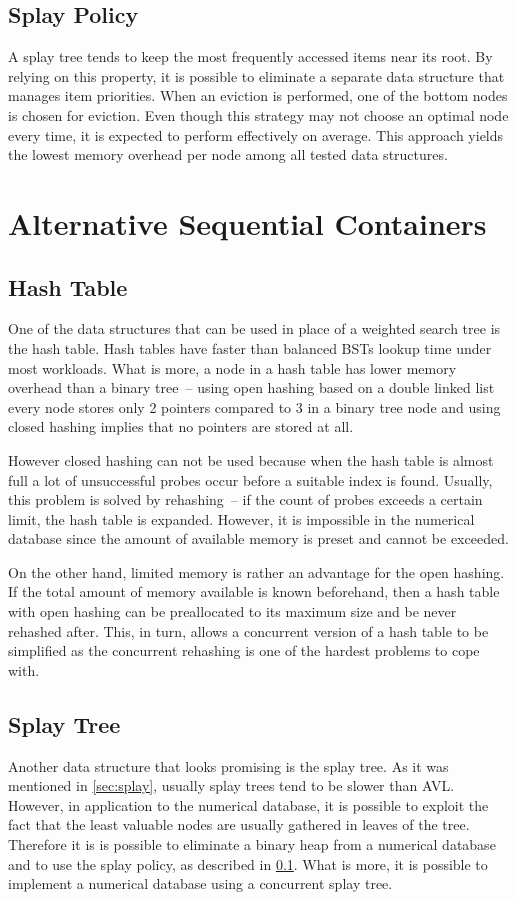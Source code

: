 \subsection{Splay Policy}
\label{sec:spolicy}
A splay tree tends to keep the most frequently accessed items near its root. By relying on this property, it is possible to eliminate a separate data structure that manages item priorities. When an eviction is performed, one of the bottom nodes is chosen for eviction. Even though this strategy may not choose an optimal node every time, it is expected to perform effectively on average. This approach yields the lowest memory overhead per node among all tested data structures.


\section{Alternative Sequential Containers}

\subsection{Hash Table}
One of the data structures that can be used in place of a weighted search tree is the hash table. Hash tables have faster than balanced BSTs lookup time under most workloads. What is more, a node in a hash table has lower memory overhead than a binary tree~-- using open hashing based on a double linked list every node stores only 2 pointers compared to 3 in a binary tree node and using closed hashing implies that no pointers are stored at all.

However closed hashing can not be used because when the hash table is almost full a lot of unsuccessful probes occur before a suitable index is found. Usually, this problem is solved by rehashing~-- if the count of probes exceeds a certain limit, the hash table is expanded. However, it is impossible in the numerical database since the amount of available memory is preset and cannot be exceeded.

On the other hand, limited memory is rather an advantage for the open hashing. If the total amount of memory available is known beforehand, then a hash table with open hashing can be preallocated to its maximum size and be never rehashed after. This, in turn, allows a concurrent version of a hash table to be simplified as the concurrent rehashing is one of the hardest problems to cope with.

\subsection{Splay Tree}
Another data structure that looks promising is the splay tree.
As it was mentioned in \cref{sec:splay}, usually splay trees tend to be slower than AVL. However, in application to the numerical database, it is possible to exploit the fact that the least valuable nodes are usually gathered in leaves of the tree. Therefore it is is possible to eliminate a binary heap from a numerical database and to use the splay policy, as described in \cref{sec:spolicy}. What is more, it is possible to implement a numerical database using a concurrent splay tree\cite{cb_tree}.

